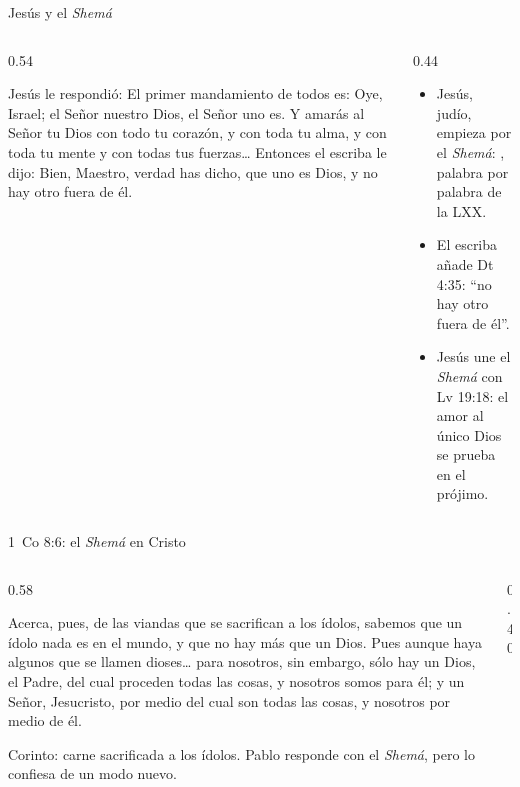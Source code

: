 \begin{frame}{Jesús y el \emph{Shemá}}
\begin{columns}[c,onlytextwidth]
\begin{column}{0.54\textwidth}
\begin{cita}[fontupper=\scriptsize\itshape]Jesús le respondió: El primer mandamiento de todos es: Oye, Israel; el Señor nuestro Dios, el Señor uno es. Y amarás al Señor tu Dios con todo tu corazón, y con toda tu alma, y con toda tu mente y con todas tus fuerzas\ldots{} Entonces el escriba le dijo: Bien, Maestro, verdad has dicho, que uno es Dios, y no hay otro fuera de él.\end{cita}
\end{column}
\begin{column}{0.44\textwidth}\small
\begin{itemize}
\item Jesús, judío, empieza por el \emph{Shemá}: , palabra por palabra de la LXX.
\item El escriba añade Dt 4:35: ``no hay otro fuera de él''.
\item Jesús une el \emph{Shemá} con Lv 19:18: el amor al único Dios se prueba en el prójimo.
\end{itemize}
\end{column}
\end{columns}
\end{frame}

\begin{frame}{1~Co 8:6: el \emph{Shemá} en Cristo}
\begin{columns}[c,onlytextwidth]
\begin{column}{0.58\textwidth}
\begin{cita}[fontupper=\scriptsize\itshape]Acerca, pues, de las viandas que se sacrifican a los ídolos, sabemos que un ídolo nada es en el mundo, y que no hay más que un Dios. Pues aunque haya algunos que se llamen dioses\ldots{} para nosotros, sin embargo, sólo hay un Dios, el Padre, del cual proceden todas las cosas, y nosotros somos para él; y un Señor, Jesucristo, por medio del cual son todas las cosas, y nosotros por medio de él.\end{cita}
\scriptsize Corinto: carne sacrificada a los ídolos. Pablo responde con el \emph{Shemá}, pero lo confiesa de un modo nuevo.
\end{column}
\begin{column}{0.40\textwidth}\end{column}
\end{columns}
\end{frame}

